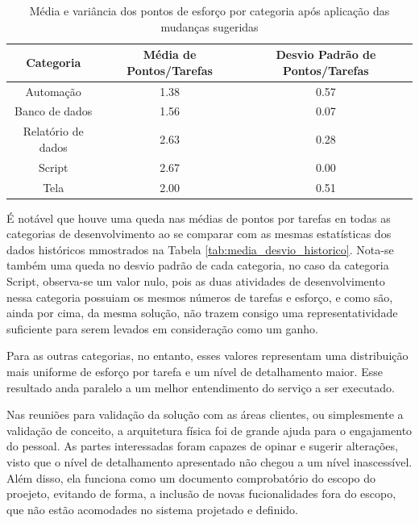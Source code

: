 	\begin{table}[!htb]
		\centering
		\begin{tabular}{ccc}
			\toprule
			\textbf{Categoria} & \textbf{Média de Pontos/Tarefas} & \textbf{Desvio Padrão de Pontos/Tarefas} \\
			\midrule
			Automação          & 1.38                             & 0.57                                 \\
			Banco de dados     & 1.56                             & 0.07                                 \\
			Relatório de dados & 2.63                             & 0.28                                 \\
			Script             & 2.67                             & 0.00                                 \\
			Tela               & 2.00                             & 0.51                                 \\
			\bottomrule
		\end{tabular}
		\caption{Média e variância dos pontos de esforço por categoria após aplicação das mudanças sugeridas}
		\label{tab:media_variancia_resultado}
	\end{table}

	É notável que houve uma queda nas médias de pontos por tarefas en todas as categorias de desenvolvimento ao se comparar com as mesmas estatísticas dos dados históricos mmostrados na Tabela
	\ref{tab:media_desvio_historico}. Nota-se também uma queda no desvio padrão de cada categoria, no caso da categoria Script, observa-se um valor nulo, pois as duas atividades de desenvolvimento nessa categoria
	possuiam os mesmos números de tarefas e esforço, e como são, ainda por cima, da mesma solução, não trazem consigo uma representatividade suficiente para serem levados em consideração como um ganho.

	Para as outras categorias, no entanto, esses valores representam uma distribuição mais uniforme de esforço por tarefa e um nível de detalhamento maior. Esse resultado anda paralelo a 
	um melhor entendimento do serviço a ser executado.

	Nas reuniões para validação da solução com as áreas clientes, ou simplesmente a validação de conceito, a arquitetura física foi de grande ajuda para o engajamento do pessoal. As partes interessadas
	foram capazes de opinar e sugerir alterações, visto que o nível de detalhamento apresentado não chegou a um nível inascessível. Além disso, ela funciona como um documento comprobatório do escopo do proejeto, evitando  de forma, a
	inclusão de novas fucionalidades fora do escopo, que não estão acomodades no sistema projetado e definido.


